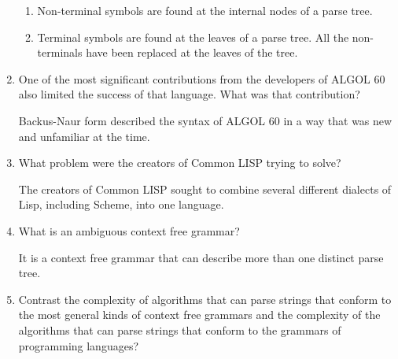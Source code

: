 \begin{enumerate}
  \begin{answer}

  \begin{enumerate}
    \item Non-terminal symbols are found at the internal nodes of a parse tree.
    \item Terminal symbols are found at the leaves of a parse tree. All the
      non-terminals have been replaced at the leaves of the tree.
    \end{enumerate}

    \end{answer}


  \item One of the most significant contributions from the developers
    of ALGOL 60 also limited the success of that language. What was
    that contribution?

  \begin{answer}

    Backus-Naur form described the syntax of ALGOL 60 in a way that was new
    and unfamiliar at the time.

    \end{answer}

  \item What problem were the creators of Common LISP trying to solve?

  \begin{answer}

    The creators of Common LISP sought to combine several different dialects of
    Lisp, including Scheme, into one language.

    \end{answer}

  \item What is an ambiguous context free grammar?

  \begin{answer}

    It is a context free grammar that can describe more than one distinct parse
    tree.

    \end{answer}

  \item Contrast the complexity of algorithms that can parse strings
    that conform to the most general kinds of context free grammars
    and the complexity of the algorithms that can parse strings that
    conform to the grammars of programming languages?

  \begin{answer}


\end{answer}
\end{enumerate}
